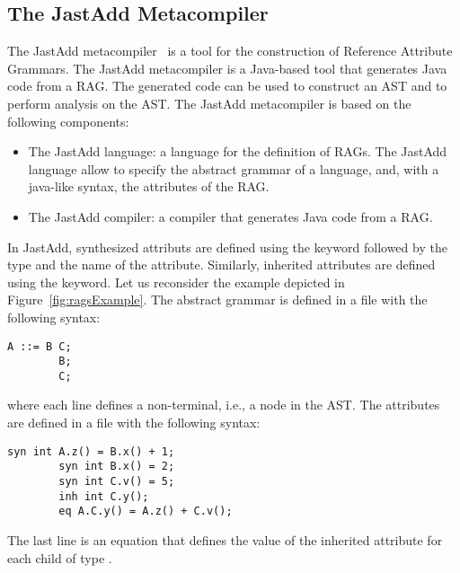 \subsection{The JastAdd Metacompiler}
\label{sec:jastadd}
The JastAdd metacompiler~\cite{DBLP:journals/entcs/HedinM01} is a tool for the construction of
Reference Attribute Grammars. The JastAdd metacompiler is a Java-based tool that generates
Java code from a RAG. The generated code can be used to construct an AST and to perform
analysis on the AST.
The JastAdd metacompiler is based on the following components:
\begin{itemize}
    \item The JastAdd language: a language for the definition of RAGs. 
    The JastAdd language allow to specify the abstract grammar of a language, and,
    with a java-like syntax, the attributes of the RAG.
    \item The JastAdd compiler: a compiler that generates Java code from a RAG.
\end{itemize}
In JastAdd, synthesized attributs are defined using the  keyword followed
by the type and the name of the attribute. Similarly, inherited attributes are defined
using the  keyword. Let us reconsider the example depicted in Figure~\ref{fig:ragsExample}. 
The abstract grammar is defined in a  file with the following syntax:
    \begin{lstlisting}[language=JastAdd]
        A ::= B C;
        B; 
        C;
    \end{lstlisting}
where each line defines a non-terminal, i.e., a node in the AST.
The attributes are defined in a  file with the following syntax:
    \begin{lstlisting}[language=JastAdd]
        syn int A.z() = B.x() + 1;
        syn int B.x() = 2;
        syn int C.v() = 5;
        inh int C.y();
        eq A.C.y() = A.z() + C.v();
    \end{lstlisting}
The last line is an equation that defines the value of the inherited attribute  for each child of type .
